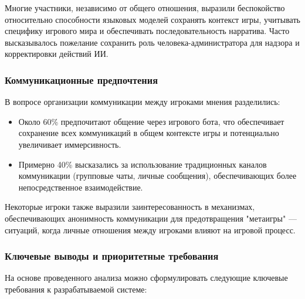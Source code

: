 Многие участники, независимо от общего отношения, выразили беспокойство относительно способности языковых моделей сохранять контекст игры, учитывать специфику игрового мира и обеспечивать последовательность нарратива. Часто высказывалось пожелание сохранить роль человека-администратора для надзора и корректировки действий ИИ.

\subsubsection{Коммуникационные предпочтения}

В вопросе организации коммуникации между игроками мнения разделились:

\begin{itemize}
    \item Около 60\% предпочитают общение через игрового бота, что обеспечивает сохранение всех коммуникаций в общем контексте игры и потенциально увеличивает иммерсивность.

    \item Примерно 40\% высказались за использование традиционных каналов коммуникации (групповые чаты, личные сообщения), обеспечивающих более непосредственное взаимодействие.
\end{itemize}

Некоторые игроки также выразили заинтересованность в механизмах, обеспечивающих анонимность коммуникации для предотвращения "{}метаигры"{} — ситуаций, когда личные отношения между игроками влияют на игровой процесс.

\subsubsection{Ключевые выводы и приоритетные требования}

На основе проведенного анализа можно сформулировать следующие ключевые требования к разрабатываемой системе:

